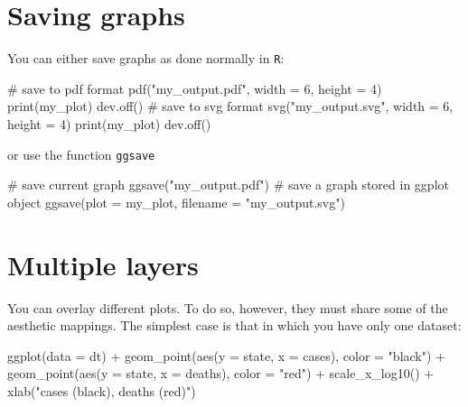 \documentclass[
  letterpaper,
  DIV=11,
  numbers=noendperiod]{scrreprt}
\newenvironment{Shaded}{\begin{snugshade}}{\end{snugshade}}
\newcommand{\AttributeTok}[1]{\textcolor[rgb]{0.40,0.45,0.13}{#1}}
\newcommand{\CommentTok}[1]{\textcolor[rgb]{0.37,0.37,0.37}{#1}}
\newcommand{\DecValTok}[1]{\textcolor[rgb]{0.68,0.00,0.00}{#1}}
\newcommand{\FunctionTok}[1]{\textcolor[rgb]{0.28,0.35,0.67}{#1}}
\newcommand{\NormalTok}[1]{\textcolor[rgb]{0.00,0.23,0.31}{#1}}
\newcommand{\SpecialCharTok}[1]{\textcolor[rgb]{0.37,0.37,0.37}{#1}}
\newcommand{\StringTok}[1]{\textcolor[rgb]{0.13,0.47,0.30}{#1}}
\begin{document}
\hypertarget{saving-graphs}{%
\section{Saving graphs}\label{saving-graphs}}

You can either save graphs as done normally in \texttt{R}:

\begin{Shaded}
\begin{Highlighting}[]
\CommentTok{\# save to pdf format}
\FunctionTok{pdf}\NormalTok{(}\StringTok{"my\_output.pdf"}\NormalTok{, }\AttributeTok{width =} \DecValTok{6}\NormalTok{, }\AttributeTok{height =} \DecValTok{4}\NormalTok{)}
\FunctionTok{print}\NormalTok{(my\_plot)}
\FunctionTok{dev.off}\NormalTok{()}
\CommentTok{\# save to svg format}
\FunctionTok{svg}\NormalTok{(}\StringTok{"my\_output.svg"}\NormalTok{, }\AttributeTok{width =} \DecValTok{6}\NormalTok{, }\AttributeTok{height =} \DecValTok{4}\NormalTok{)}
\FunctionTok{print}\NormalTok{(my\_plot)}
\FunctionTok{dev.off}\NormalTok{()}
\end{Highlighting}
\end{Shaded}

or use the function \texttt{ggsave}

\begin{Shaded}
\begin{Highlighting}[]
\CommentTok{\# save current graph}
\FunctionTok{ggsave}\NormalTok{(}\StringTok{"my\_output.pdf"}\NormalTok{)}
\CommentTok{\# save a graph stored in ggplot object}
\FunctionTok{ggsave}\NormalTok{(}\AttributeTok{plot =}\NormalTok{ my\_plot, }\AttributeTok{filename =} \StringTok{"my\_output.svg"}\NormalTok{)}
\end{Highlighting}
\end{Shaded}

\hypertarget{multiple-layers}{%
\section{Multiple layers}\label{multiple-layers}}

You can overlay different plots. To do so, however, they must share some
of the aesthetic mappings. The simplest case is that in which you have
only one dataset:

\begin{Shaded}
\begin{Highlighting}[]
\FunctionTok{ggplot}\NormalTok{(}\AttributeTok{data =}\NormalTok{ dt) }\SpecialCharTok{+} 
  \FunctionTok{geom\_point}\NormalTok{(}\FunctionTok{aes}\NormalTok{(}\AttributeTok{y =}\NormalTok{ state, }\AttributeTok{x =}\NormalTok{ cases), }\AttributeTok{color =} \StringTok{"black"}\NormalTok{) }\SpecialCharTok{+} 
  \FunctionTok{geom\_point}\NormalTok{(}\FunctionTok{aes}\NormalTok{(}\AttributeTok{y =}\NormalTok{ state, }\AttributeTok{x =}\NormalTok{ deaths), }\AttributeTok{color =} \StringTok{"red"}\NormalTok{) }\SpecialCharTok{+}
  \FunctionTok{scale\_x\_log10}\NormalTok{() }\SpecialCharTok{+} 
  \FunctionTok{xlab}\NormalTok{(}\StringTok{"cases (black), deaths (red)"}\NormalTok{)}
\end{Highlighting}
\end{Shaded}
\end{document}
